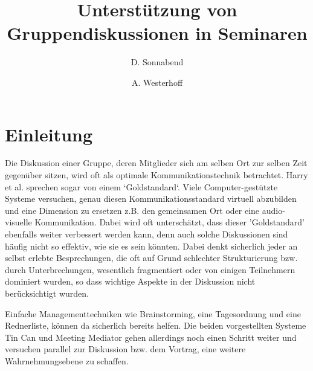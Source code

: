 \documentclass{seminarvorlage}
\begin{document}
\title{Unterstützung von Gruppendiskussionen in Seminaren}
\author{
  \alignauthor D. Sonnabend\\
    \and
  \alignauthor A. Westerhoff\\
}

\maketitle



\section{Einleitung}
Die Diskussion einer Gruppe, deren Mitglieder sich am selben Ort zur selben Zeit
gegenüber sitzen, wird oft als optimale Kommunikationstechnik betrachtet. Harry
et al. \cite{HarGorSch2012} sprechen sogar von einem `Goldstandard`. Viele
Com\-puter-\-ge\-stützte Systeme versuchen, genau diesen
Kommunikationsstandard virtuell abzubilden und eine Dimension zu ersetzen z.B. den gemeinsamen
Ort oder eine audio-visuelle Kommunikation. Dabei wird oft unterschätzt,
dass dieser 'Goldstandard' ebenfalls weiter verbessert werden kann, denn auch
solche Diskussionen sind häufig nicht so effektiv, wie sie es sein könnten.
Dabei denkt sicherlich jeder an selbst erlebte Besprechungen, die oft auf Grund schlechter
Strukturierung bzw. durch Unterbrechungen, wesentlich fragmentiert oder
von einigen Teilnehmern dominiert wurden, so dass wichtige Aspekte in der
Diskussion nicht berücksichtigt wurden.

Einfache Managementtechniken wie Brainstorming, eine Tagesordnung und eine
Rednerliste, können da sicherlich bereits helfen.
Die beiden vorgestellten Systeme Tin Can\cite{HarGorSch2012} und Meeting
Mediator\cite{KimChaHolPent2008} gehen allerdings noch einen Schritt weiter und
versuchen parallel zur Diskussion bzw. dem Vortrag, eine weitere
Wahrnehmungsebene zu schaffen.
\end{document}
